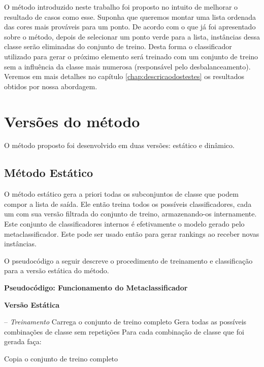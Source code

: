 O método introduzido neste trabalho foi proposto no intuito de melhorar o resultado de casos como esse.
Suponha que queremos montar uma lista ordenada das cores mais prováveis para um ponto.
De acordo com o que já foi apresentado sobre o método, depois de selecionar um ponto verde para a lista, instâncias dessa classe serão eliminadas do conjunto de treino.
Desta forma o classificador utilizado para gerar o próximo elemento será treinado com um conjunto de treino sem a influência da classe mais numerosa (responsável pelo desbalanceamento).
Veremos em mais detalhes no capítulo \ref{chap:descricaodostestes} os resultados obtidos por nossa abordagem.

\section{Versões do método}
\label{sec:versoesdometodo}

O método proposto foi desenvolvido em duas versões: estático e dinâmico.


\subsection{Método Estático}

O método estático gera a priori todas os subconjuntos de classe que podem compor a lista de saída. 
Ele então treina todos os possíveis classificadores, cada um com sua versão filtrada do conjunto de treino, armazenando-os internamente.
Este conjunto de classificadores internos é efetivamente o modelo gerado pelo metaclassificador. 
Este pode ser usado então para gerar rankings ao receber novas instâncias. 

O pseudocódigo a seguir descreve o procedimento de treinamento e classificação para a versão estática do método.
\\

\hline
\begin{center}
\textbf{Pseudocódigo: Funcionamento do Metaclassificador}

\textbf{Versão Estática}
\end{center}
\hline
\hfill \break
-- \textit{Treinamento}\newline
Carrega o conjunto de treino completo\newline
Gera todas as possíveis combinações de classe sem repetições\newline
Para cada combinação de classe que foi gerada faça:

\quad Copia o conjunto de treino completo

